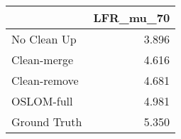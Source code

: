 \begin{tabular}{lr}
\toprule
{} & LFR_mu_70 \\
\midrule
No Clean Up  &     3.896 \\
Clean-merge  &     4.616 \\
Clean-remove &     4.681 \\
OSLOM-full   &     4.981 \\
Ground Truth &     5.350 \\
\bottomrule
\end{tabular}
